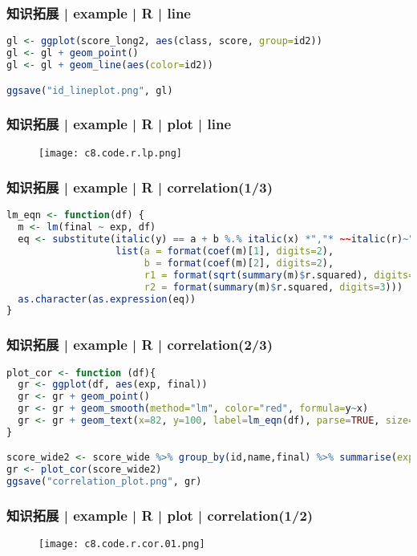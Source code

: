 \begin{frame}[fragile]
  \frametitle{知识拓展 | example | R | line}
\begin{lstlisting}[language=r]
gl <- ggplot(score_long2, aes(class, score, group=id2))
gl <- gl + geom_point()
gl <- gl + geom_line(aes(color=id2))

ggsave("id_lineplot.png", gl)
\end{lstlisting}
\end{frame}

\begin{frame}
  \frametitle{知识拓展 | example | R | plot | line}
  \begin{figure}
    \centering
    \texttt{[image: c8.code.r.lp.png]}
  \end{figure}
\end{frame}

\begin{frame}[fragile]
  \frametitle{知识拓展 | example | R | correlation(1/3)}
\begin{lstlisting}[language=r]
lm_eqn <- function(df) {
  m <- lm(final ~ exp, df)
  eq <- substitute(italic(y) == a + b %.% italic(x) *","* ~~italic(r)~"="~r1 *","* ~~italic(R)^2~"="~r2, 
                   list(a = format(coef(m)[1], digits=2), 
                        b = format(coef(m)[2], digits=2), 
                        r1 = format(sqrt(summary(m)$r.squared), digits=3),
                        r2 = format(summary(m)$r.squared, digits=3)))
  as.character(as.expression(eq))
}
\end{lstlisting}
\end{frame}

\begin{frame}[fragile]
  \frametitle{知识拓展 | example | R | correlation(2/3)}
\begin{lstlisting}[language=r]
plot_cor <- function (df){
  gr <- ggplot(df, aes(exp, final))
  gr <- gr + geom_point()
  gr <- gr + geom_smooth(method="lm", color="red", formula=y~x)
  gr <- gr + geom_text(x=82, y=100, label=lm_eqn(df), parse=TRUE, size=5, color="blue")
}

score_wide2 <- score_wide %>% group_by(id,name,final) %>% summarise(exp=mean(c(e6,e7,e8,e9))) 
gr <- plot_cor(score_wide2)
ggsave("correlation_plot.png", gr)
\end{lstlisting}
\end{frame}

\begin{frame}
  \frametitle{知识拓展 | example | R | plot | correlation(1/2)}
  \begin{figure}
    \centering
    \texttt{[image: c8.code.r.cor.01.png]}
  \end{figure}
\end{frame}

